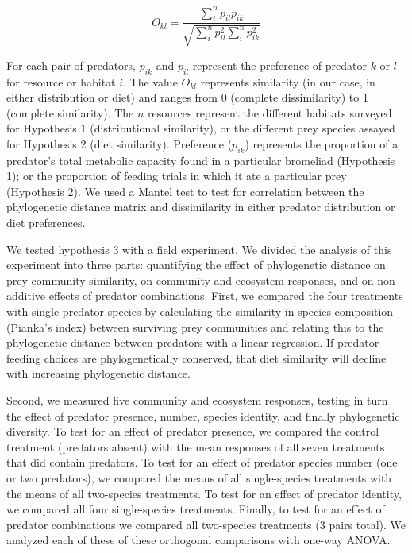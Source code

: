 \documentclass[11pt]{article}
\begin{document}
\begin{equation}
{ O_{kl}=\frac{\sum_i^n{p_{il} p_{ik}}}{\sqrt{\sum_i^n{p_{il}^2} \sum_i^n{p_{ik}^2}}} }
\end{equation}

For each pair of predators, \(p_{ik}\) and \(p_{il}\) represent the
preference of predator \(k\) or \(l\) for resource or habitat \(i\). The
value \(O_{kl}\) represents similarity (in our case, in either
distribution or diet) and ranges from 0 (complete dissimilarity) to 1
(complete similarity). The \(n\) resources represent the different
habitats surveyed for Hypothesis 1 (distributional similarity), or the
different prey species assayed for Hypothesis 2 (diet similarity).
Preference (\(p_{ik}\)) represents the proportion of a predator's total
metabolic capacity found in a particular bromeliad (Hypothesis 1); or
the proportion of feeding trials in which it ate a particular prey
(Hypothesis 2). We used a Mantel test to test for correlation between the phylogenetic distance matrix
and dissimilarity in either predator distribution or diet preferences.

We tested hypothesis 3 with a field experiment. We divided the analysis of this experiment into three parts: quantifying
the effect of phylogenetic distance on prey community similarity, on
community and ecosystem responses, and on non-additive effects of
predator combinations. First, we compared the four treatments with
single predator species by calculating the similarity in species
composition (Pianka's index) between surviving prey communities and
relating this to the phylogenetic distance between predators with a
linear regression. If predator feeding choices are phylogenetically
conserved, that diet similarity will decline with increasing
phylogenetic distance.

Second, we measured five community and ecosystem responses, testing in
turn the effect of predator presence, number, species identity, and
finally phylogenetic diversity. To test for an effect of predator
presence, we compared the control treatment (predators absent) with the
mean responses of all seven treatments that did contain predators. To
test for an effect of predator species number (one or two predators), we
compared the means of all single-species treatments with the means of
all two-species treatments. To test for an effect of predator identity,
we compared all four single-species treatments. Finally, to test for an
effect of predator combinations we compared all two-species treatments
(3 pairs total). We analyzed each of these of these orthogonal
comparisons with one-way ANOVA.
\end{document}
